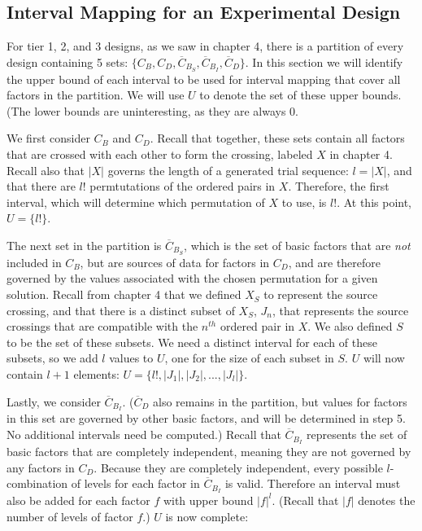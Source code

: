 \subsection{Interval Mapping for an Experimental Design}

For tier 1, 2, and 3 designs, as we saw in chapter 4, there is a partition of every design containing 5 sets: $\{C_B, C_D, \overline{C}_{B_S}, \overline{C}_{B_I}, \overline{C}_D\}$. In this section we will identify the upper bound of each interval to be used for interval mapping that cover all factors in the partition. We will use $U$ to denote the set of these upper bounds. (The lower bounds are uninteresting, as they are always $0$.

We first consider $C_B$ and $C_D$. Recall that together, these sets contain all factors that are crossed with each other to form the crossing, labeled $X$ in chapter 4. Recall also that $|X|$ governs the length of a generated trial sequence: $l = |X|$, and that there are $l!$ permtutations of the ordered pairs in $X$. Therefore, the first interval, which will determine which permutation of $X$ to use, is $l!$. At this point, $U = \{l!\}$.

The next set in the partition is $\overline{C}_{B_S}$, which is the set of basic factors that are \textit{not} included in $C_B$, but are sources of data for factors in $C_D$, and are therefore governed by the values associated with the chosen permutation for a given solution. Recall from chapter 4 that we defined $X_S$ to represent the source crossing, and that there is a distinct subset of $X_S$, $J_n$, that represents the source crossings that are compatible with the $n^{th}$ ordered pair in $X$. We also defined $S$ to be the set of these subsets. We need a distinct interval for each of these subsets, so we add $l$ values to $U$, one for the size of each subset in $S$. $U$ will now contain $l + 1$ elements: $U = \{l!, |J_1|, |J_2|, ..., |J_l|\}$.

Lastly, we consider $\overline{C}_{B_I}$. ($\overline{C}_D$ also remains in the partition, but values for factors in this set are governed by other basic factors, and will be determined in step 5. No additional intervals need be computed.) Recall that $\overline{C}_{B_I}$ represents the set of basic factors that are completely independent, meaning they are not governed by any factors in $C_D$. Because they are completely independent, every possible $l$-combination of levels for each factor in $\overline{C}_{B_I}$ is valid. Therefore an interval must also be added for each factor $f$ with upper bound $|f|^l$. (Recall that $|f|$ denotes the number of levels of factor $f$.) $U$ is now complete:


